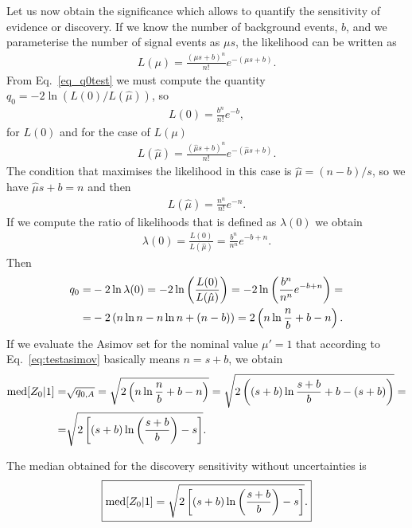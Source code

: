 \documentclass[12pt,a4paper]{article}
\begin{document}
Let us now obtain the significance which allows to quantify the sensitivity of evidence or discovery. If we know the number of background events, $b$, and we parameterise the number of signal events as $\mu s$, the likelihood can be written as
\begin{align}
L(\mu) = \frac{(\mu s + b)^n}{n!}e^{-(\mu s + b)}.
\end{align}
From Eq.~\eqref{eq_q0test} we must compute the quantity $q_0=-2\ln(L(0)/L(\hat{\mu}))$, so
\begin{align}
L(0)=\frac{b^n}{n!}e^{-b},
\end{align}
for $L(0)$ and for the case of $L(\mu)$
\begin{align}
L(\hat{\mu})=\frac{(\hat{\mu}s +b)^n}{n!}e^{-(\hat{\mu}s +b)}.
\end{align}
The condition that maximises the likelihood in this case is $\hat{\mu}=(n-b)/s$, so we have $\hat{\mu}s+b=n$ and then
\begin{align}
L(\hat{\mu})=\frac{n^n}{n!}e^{-n}.
\label{eq:muhat}
\end{align}
If we compute the ratio of likelihoods that is defined as $\lambda(0)$ we obtain
\begin{align}
\lambda(0)=\frac{L(0)}{L(\hat{\mu})}=\frac{b^n}{n^n}e^{-b+n}.
\end{align}
Then
\begin{align}
q_0=&-2\ln\lambda(0)=-2\ln\left(\frac{L(0)}{L(\hat{\mu})}\right)=-2\ln\left(\frac{b^n}{n^n}e^{-b+n}\right)= \notag\\
=&-2\left(n\ln n-n\ln n + (n-b)\right)=2\left(n \ln \frac{n}{b}+b-n\right).
\end{align}
If we evaluate the Asimov set for the nominal value $\mu'=1$ that according to Eq.~\eqref{eq:testasimov} basically means $n=s+b$, we obtain
\begin{align}
{\rm med}[Z_0|1]=&\sqrt{q_{0,A}}=\sqrt{2\left(n\ln\frac{n}{b}+b-n\right)}=\sqrt{2\left((s+b)\ln\frac{s+b}{b}+b-(s+b)\right)}=\notag\\=&\sqrt{2\left[(s+b)\ln\left(\frac{s+b}{b}\right)-s\right]}.
\end{align}

The median obtained for the discovery sensitivity without uncertainties is
\begin{align}
\boxed{{\rm med}[Z_0|1]=\sqrt{2\left[(s+b)\ln\left(\frac{s+b}{b}\right)-s\right]}.}
\label{eq:meddiscoverywouncer}
\end{align}
\end{document}
